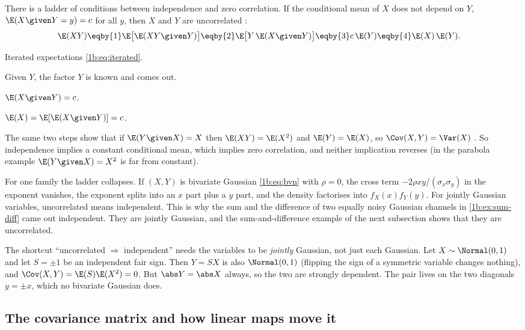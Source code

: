 There is a ladder of conditions between independence and zero correlation. If
the conditional mean of $X$ does not depend on $Y$, $\E(X\given Y=y)=c$ for all
$y$, then $X$ and $Y$ are uncorrelated :
\begin{align*}
  \E(XY)
  &\eqby{1} \E\bigl[\E(XY\given Y)\bigr]
   \eqby{2} \E\bigl[Y\,\E(X\given Y)\bigr]
   \eqby{3} c\,\E(Y)
   \eqby{4} \E(X)\,\E(Y) .
\end{align*}
\begin{explain}
  \item Iterated expectations \eqref{1b:eq:iterated}.
  \item Given $Y$, the factor $Y$ is known and comes out.
  \item $\E(X\given Y)=c$.
  \item $\E(X)=\E[\E(X\given Y)]=c$.
\end{explain}
The same two steps show that if $\E(Y\given X)=X$ then $\E(XY)=\E(X^2)$ and
$\E(Y)=\E(X)$, so $\Cov(X,Y)=\Var(X)$ . So
independence implies a constant conditional mean, which implies zero
correlation, and neither implication reverses (in the parabola example
$\E(Y\given X)=X^2$ is far from constant).

For one family the ladder collapses. If $(X,Y)$ is bivariate Gaussian
\eqref{1b:eq:bvn} with $\rho=0$, the cross term $-2\rho xy/(\sigma_x\sigma_y)$
in the exponent vanishes, the exponent splits into an $x$ part plus a $y$
part, and the density factorises into $f_X(x)f_Y(y)$. For jointly Gaussian
variables, uncorrelated means independent. This is why the sum and the
difference of two equally noisy Gaussian channels in \cref{1b:ex:sum-diff}
came out independent. They are jointly Gaussian, and the sum-and-difference
example of the next subsection shows that they are uncorrelated.

\begin{pitfall}
The shortcut ``uncorrelated $\Rightarrow$ independent'' needs the variables to
be \emph{jointly} Gaussian, not just each Gaussian. Let $X\sim\Normal(0,1)$ and
let $S=\pm1$ be an independent fair sign. Then $Y=SX$ is also $\Normal(0,1)$
(flipping the sign of a symmetric variable changes nothing), and
$\Cov(X,Y)=\E(S)\E(X^2)=0$. But $\abs Y=\abs X$ always, so the two are
strongly dependent. The pair lives on the two diagonals $y=\pm x$, which no
bivariate Gaussian does.
\end{pitfall}

\subsection{The covariance matrix and how linear maps move it}

